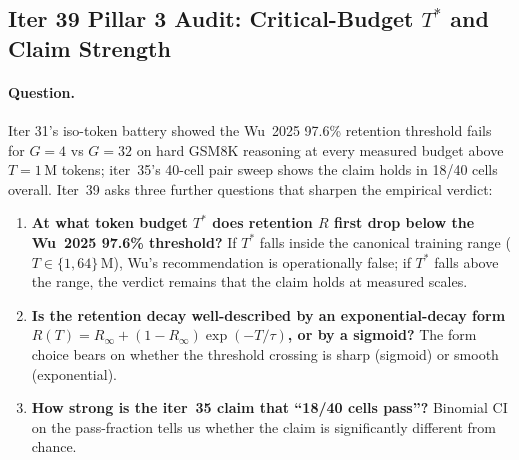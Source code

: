 \subsection{Iter 39 Pillar 3 Audit: Critical-Budget $T^*$ and Claim Strength}
\label{sec:group-size-iter39}

\paragraph{Question.}
Iter 31's iso-token battery showed the Wu~2025 97.6\% retention
threshold fails for $G{=}4$ vs $G{=}32$ on hard GSM8K reasoning at every
measured budget above $T{=}1$\,M tokens; iter~35's 40-cell pair sweep
shows the claim holds in 18/40 cells overall. Iter~39 asks three
further questions that sharpen the empirical verdict:
\begin{enumerate}
  \item \textbf{At what token budget $T^*$ does retention $R$ first
        drop below the Wu~2025 97.6\% threshold?} If $T^*$ falls
        inside the canonical training range ($T \in \{1, 64\}$\,M),
        Wu's recommendation is operationally false; if $T^*$ falls
        above the range, the verdict remains that the claim holds at
        measured scales.
  \item \textbf{Is the retention decay well-described by an
        exponential-decay form $R(T) = R_\infty + (1-R_\infty) \exp(-T/\tau)$,
        or by a sigmoid?} The form choice bears on whether the
        threshold crossing is sharp (sigmoid) or smooth (exponential).
  \item \textbf{How strong is the iter~35 claim that ``18/40 cells
        pass''?} Binomial CI on the pass-fraction tells us whether the
        claim is significantly different from chance.
\end{enumerate}

